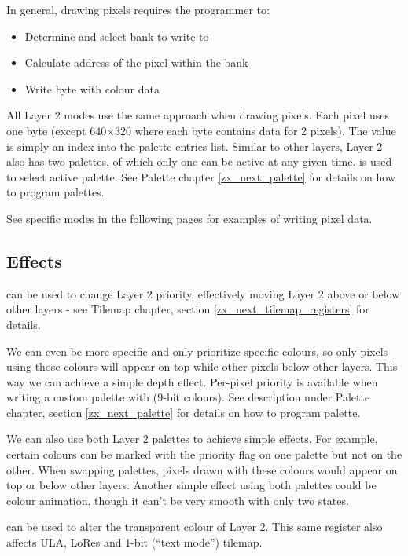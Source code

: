 In general, drawing pixels requires the programmer to:

\begin{itemize}[topsep=1pt,itemsep=1pt]
	\item Determine and select bank to write to
	\item Calculate address of the pixel within the bank
	\item Write byte with colour data
\end{itemize}

All Layer 2 modes use the same approach when drawing pixels. Each pixel uses one byte (except 640$\times$320 where each byte contains data for 2 pixels). The value is simply an index into the palette entries list. Similar to other layers, Layer 2 also has two palettes, of which only one can be active at any given time.  is used to select active palette. See Palette chapter \ref{zx_next_palette} for details on how to program palettes.

See specific modes in the following pages for examples of writing pixel data.


\subsection{Effects}

 can be used to change Layer 2 priority, effectively moving Layer 2 above or below other layers - see Tilemap chapter, section \ref{zx_next_tilemap_registers} for details.

We can even be more specific and only prioritize specific colours, so only pixels using those colours will appear on top while other pixels below other layers. This way we can achieve a simple depth effect. Per-pixel priority is available when writing a custom palette with  (9-bit colours). See description under Palette chapter, section \ref{zx_next_palette} for details on how to program palette.

We can also use both Layer 2 palettes to achieve simple effects. For example, certain colours can be marked with the priority flag on one palette but not on the other. When swapping palettes, pixels drawn with these colours would appear on top or below other layers. Another simple effect using both palettes could be colour animation, though it can't be very smooth with only two states.

 can be used to alter the transparent colour of Layer 2. This same register also affects ULA, LoRes and 1-bit (``text mode'') tilemap. 

